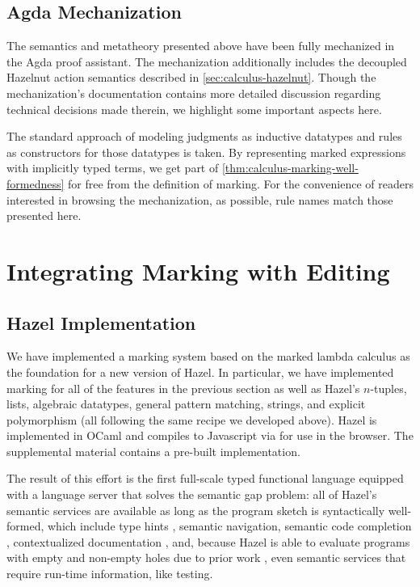 \subsection{Agda Mechanization}
\label{sec:calculus-agda}

The semantics and metatheory presented above have been fully mechanized in the Agda proof assistant.
The mechanization additionally includes the decoupled Hazelnut action semantics described in
\cref{sec:calculus-hazelnut}.
Though the mechanization's documentation contains more detailed discussion regarding technical
decisions made therein, we highlight some important aspects here.

The standard approach of modeling judgments as inductive datatypes and rules as constructors for
those datatypes is taken.
By representing marked expressions with implicitly typed terms, we get part of
\cref{thm:calculus-marking-well-formedness} for free from the definition of marking.
For the convenience of readers interested in browsing the mechanization, as possible, rule names
match those presented here.




\section{Integrating Marking with Editing}
\label{sec:calculus-structured-editing}
\subsection{Hazel Implementation}
\label{sec:calculus-hazel}

We have implemented a marking system based on the marked lambda calculus as the foundation for a new version of Hazel. %
In particular, we have implemented marking for all of the features in the previous section as well as Hazel's $n$-tuples, lists, algebraic datatypes, general pattern matching, strings, and explicit polymorphism (all following the same recipe we developed above).
Hazel is implemented in OCaml and compiles to Javascript via  \cite{jsoo} for use in the browser.
The supplemental material contains a pre-built implementation.

The result of this effort is the first full-scale typed functional language equipped with a language server that solves the semantic gap problem: all of Hazel's semantic services are available as long as the program sketch is syntactically well-formed, which include type hints \cite{potter2020hazel}, semantic navigation, semantic code completion \cite{potter2020hazel,blinn2022integrative}, contextualized documentation \cite{potter2022contextualized}, and, because Hazel is able to evaluate programs with empty and non-empty holes due to prior work \cite{HazelLive}, even semantic services that require run-time information, like testing.
% 

